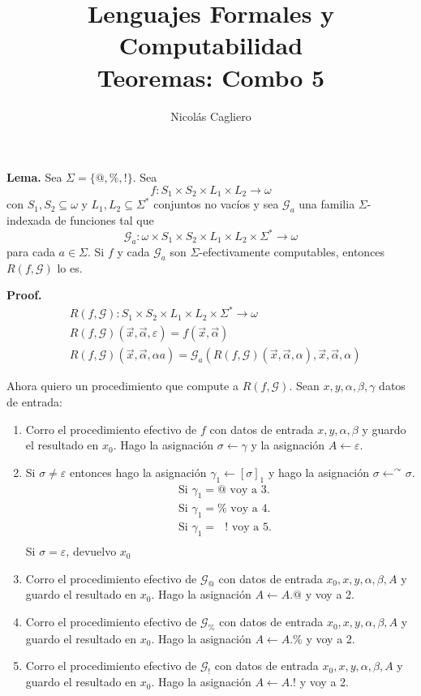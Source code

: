 \documentclass{article}
\title{Lenguajes Formales y Computabilidad \\
        \large Teoremas: Combo 5 }
\author{Nicolás Cagliero}
\begin{document}
\maketitle

\textbf{Lema.} Sea $\Sigma = \{@, \%, !\}$. Sea
\[
f : S_1 \times S_2 \times L_1 \times L_2 \to \omega
\]
con $S_1, S_2 \subseteq \omega$ y $L_1, L_2 \subseteq \Sigma^*$ conjuntos no vacíos y sea $\mathcal{G}_a$ una familia $\Sigma$-indexada de funciones tal que
\[
\mathcal{G}_a : \omega \times S_1 \times S_2 \times L_1 \times L_2 \times \Sigma^* \to \omega
\]
para cada $a \in \Sigma$. Si $f$ y cada $\mathcal{G}_a$ son $\Sigma$-efectivamente computables, entonces $R(f, \mathcal{G})$ lo es.

\bigskip
\textbf{Proof.} 
\begin{align*}
        &R(f, \mathcal{G}) : S_1 \times S_2 \times L_1 \times L_2 \times \Sigma^{*} \to \omega\\
        &R(f, \mathcal{G})(\vec{x}, \vec{\alpha}, \varepsilon) = f(\vec{x}, \vec{\alpha})\\
        &R(f, \mathcal{G})(\vec{x}, \vec{\alpha}, \alpha a) = \mathcal{G}_a(R(f, \mathcal{G})(\vec{x}, \vec{\alpha}, \alpha), \vec{x}, \vec{\alpha}, \alpha)
\end{align*}

Ahora quiero un procedimiento que compute a $R(f, \mathcal{G})$. Sean $x, y, \alpha, \beta, \gamma$ datos de entrada:
\begin{enumerate}
        \item Corro el procedimiento efectivo de $f$ con datos de entrada $x, y, \alpha, \beta$ y guardo el resultado en $x_0$. Hago la asignación $\sigma \leftarrow \gamma$ y la asignación $A \leftarrow \varepsilon$.
        \item Si $\sigma \neq \varepsilon$ entonces hago la asignación $\gamma_1 \leftarrow [\sigma]_1$ y hago la asignación $\sigma \leftarrow^{\curvearrowright} \sigma$. 
        \begin{align*}
                &\text{Si } \gamma_1 = @ \text{ voy a 3.}\\
                &\text{Si } \gamma_1 = \% \text{ voy a 4.}\\
                &\text{Si } \gamma_1 = \text{ } ! \text{ voy a 5.}\\
        \end{align*}
        Si $\sigma = \varepsilon$, devuelvo $x_0$
        \item Corro el procedimiento efectivo de $\mathcal{G}_@$ con datos de entrada $x_0, x, y, \alpha, \beta, A$ y guardo el resultado en $x_0$. Hago la asignación $A \leftarrow A.@$ y voy a 2.
        \item Corro el procedimiento efectivo de $\mathcal{G}_\%$ con datos de entrada $x_0, x, y, \alpha, \beta, A$ y guardo el resultado en $x_0$. Hago la asignación $A \leftarrow A.\%$ y voy a 2.
        \item Corro el procedimiento efectivo de $\mathcal{G}_!$ con datos de entrada $x_0, x, y, \alpha, \beta, A$ y guardo el resultado en $x_0$. Hago la asignación $A \leftarrow A.!$ y voy a 2.
\end{enumerate}
\bigskip
\bigskip
\end{document}

